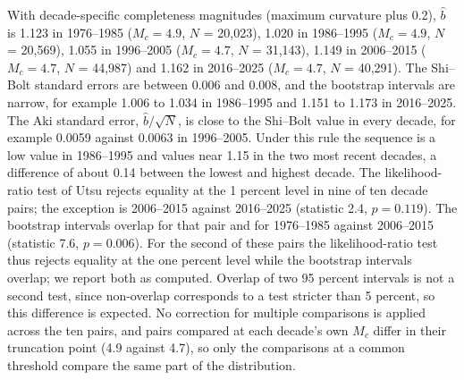 \documentclass[11pt]{article}
\begin{document}
With decade-specific completeness magnitudes (maximum curvature plus 0.2), $\hat b$ is 1.123 in 1976--1985 ($M_c = 4.9$, $N$ = 20,023), 1.020 in 1986--1995 ($M_c = 4.9$, $N$ = 20,569), 1.055 in 1996--2005 ($M_c = 4.7$, $N$ = 31,143), 1.149 in 2006--2015 ($M_c = 4.7$, $N$ = 44,987) and 1.162 in 2016--2025 ($M_c = 4.7$, $N$ = 40,291).
The Shi--Bolt standard errors are between 0.006 and 0.008, and the bootstrap intervals are narrow, for example 1.006 to 1.034 in 1986--1995 and 1.151 to 1.173 in 2016--2025.
The Aki standard error, $\hat b/\sqrt{N}$, is close to the Shi--Bolt value in every decade, for example 0.0059 against 0.0063 in 1996--2005.
Under this rule the sequence is a low value in 1986--1995 and values near 1.15 in the two most recent decades, a difference of about 0.14 between the lowest and highest decade. The likelihood-ratio test of Utsu rejects equality at the 1 percent level in nine of ten decade pairs; the exception is 2006--2015 against 2016--2025 (statistic 2.4, $p = 0.119$). The bootstrap intervals overlap for that pair and for 1976--1985 against 2006--2015 (statistic 7.6, $p = 0.006$).
For the second of these pairs the likelihood-ratio test thus rejects equality at the one percent level while the bootstrap intervals overlap; we report both as computed. Overlap of two 95 percent intervals is not a second test, since non-overlap corresponds to a test stricter than 5 percent, so this difference is expected. No correction for multiple comparisons is applied across the ten pairs, and pairs compared at each decade's own $M_c$ differ in their truncation point (4.9 against 4.7), so only the comparisons at a common threshold compare the same part of the distribution.
\end{document}
